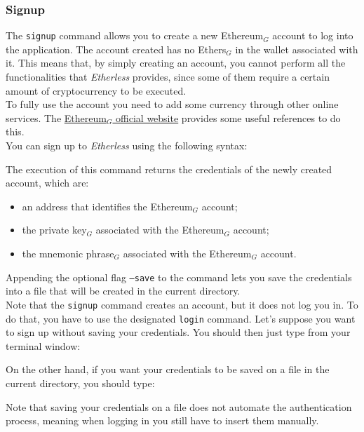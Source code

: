 \subsubsection{Signup}
The \texttt{signup} command allows you to create a new Ethereum$_{G}$ account to log into the application. The account created has no Ethers$_{G}$ in the wallet associated with it. This means that, by simply creating an account, you cannot perform all the functionalities that \textit{Etherless} provides, since some of them require a certain amount of cryptocurrency to be executed. \\
To fully use the account you need to add some currency through other online services. The \href{https://ethereum.org/en/wallets/}{Ethereum$_{G}$ official website} provides some useful references to do this.\\
You can sign up to \textit{Etherless} using the following syntax:
\begin{center}
\end{center}
\noindent The execution of this command returns the credentials of the newly created account, which are:
\begin{itemize}
	\item an address that identifies the Ethereum$_{G}$ account;
	\item the private key$_{G}$ associated with the Ethereum$_{G}$ account;
	\item the mnemonic phrase$_{G}$ associated with the Ethereum$_{G}$ account.
\end{itemize}
Appending the optional flag \texttt{---save} to the command lets you save the credentials into a file that will be created in the current directory. \\
Note that the \texttt{signup} command creates an account, but it does not log you in. To do that, you have to use the designated \texttt{login} command.
Let's suppose you want to sign up without saving your credentials. You should then just type from your terminal window:
\begin{center}
\end{center}
On the other hand, if you want your credentials to be saved on a file in the current directory, you should type:
\begin{center}
\end{center}
Note that saving your credentials on a file does not automate the authentication process, meaning when logging in you still have to insert them manually.

